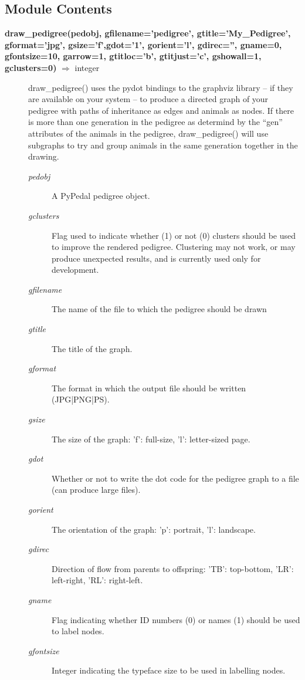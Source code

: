 \subsection*{Module Contents}
\begin{description}
\item[\textbf{draw\_pedigree(pedobj, gfilename='pedigree', gtitle='My\_Pedigree', gformat='jpg', gsize='f',gdot='1', gorient='l', gdirec='', gname=0, gfontsize=10, garrow=1, gtitloc='b', gtitjust='c', gshowall=1, gclusters=0)} $\Rightarrow$ integer]
\label{sec:pyp-graphics-draw-pedigree}
draw\_pedigree() uses the pydot bindings to the graphviz library -- if they are available on your system -- to produce a directed graph of your pedigree with paths of inheritance as edges and animals as nodes. If there is more than one generation in the pedigree as determind by the ``gen'' attributes of the animals in the pedigree, draw\_pedigree() will use subgraphs to try and group animals in the same generation together in the drawing.
\begin{description}
\item[\emph{pedobj}] A PyPedal pedigree object.
\item[\emph{gclusters}] Flag used to indicate whether (1) or not (0) clusters should be used to improve the rendered pedigree. Clustering may not work, or may produce unexpected results, and is currently used only for development.
\item[\emph{gfilename}] The name of the file to which the pedigree should be drawn
\item[\emph{gtitle}] The title of the graph.
\item[\emph{gformat}] The format in which the output file should be written  (JPG|PNG|PS).
\item[\emph{gsize}] The size of the graph: 'f': full-size, 'l': letter-sized page.
\item[\emph{gdot}] Whether or not to write the dot code for the pedigree graph to a file (can produce large files).
\item[\emph{gorient}] The orientation of the graph: 'p': portrait, 'l': landscape.
\item[\emph{gdirec}] Direction of flow from parents to offspring: 'TB': top-bottom, 'LR': left-right, 'RL': right-left.
\item[\emph{gname}] Flag indicating whether ID numbers (0) or names (1) should be used to label nodes.
\item[\emph{gfontsize}] Integer indicating the typeface size to be used in labelling nodes.

\end{description}
\end{description}
